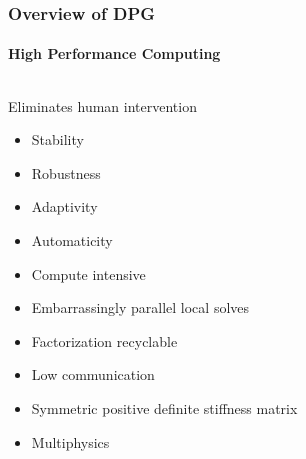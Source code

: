 \documentclass[18pt,xcolor=table]{beamer}
\begin{document}
\begin{frame}[t]
\frametitle{Overview of DPG}
\framesubtitle{High Performance Computing}
\begin{columns}[c]
\begin{column}{.5\textwidth}
Eliminates human intervention
\medskip

\begin{itemize}
  \item Stability
  \item Robustness
  \item Adaptivity
  \item Automaticity
  \item Compute intensive
  \item Embarrassingly parallel local solves
  \item Factorization recyclable
  \item Low communication
  \item Symmetric positive definite stiffness matrix
  \item Multiphysics
\end{itemize}


\end{column}
\end{columns}
\end{frame}
\end{document}

